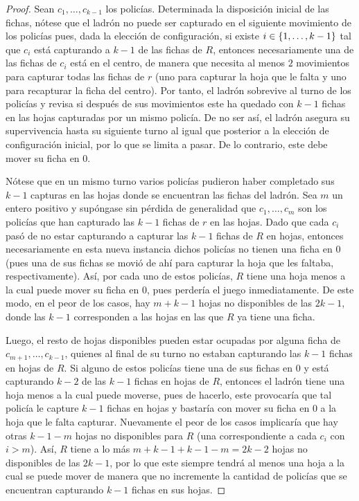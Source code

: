 \begin{proof}
    Sean $c_1,\dots, c_{k-1}$ los polic\'ias. Determinada la disposici\'on
    inicial de las fichas, n\'otese que el ladr\'on no puede ser capturado en el
    siguiente movimiento de los polic\'ias pues, dada la elecci\'on de
    configuraci\'on, si existe $i\in\{1,\dots, k-1\}$ tal que $c_i$ est\'a
    capturando a $k-1$ de las fichas de $R$, entonces necesariamente una de las
    fichas de $c_i$ est\'a en el centro, de manera que necesita al menos $2$
    movimientos para capturar todas las fichas de $r$ (uno para capturar la hoja
    que le falta y uno para recapturar la ficha del centro). Por tanto, el
    ladr\'on sobrevive al turno de los polic\'ias y revisa si despu\'es de sus
    movimientos este ha quedado con $k-1$ fichas en las hojas capturadas por un
    mismo polic\'ia. De no ser as\'i, el ladr\'on asegura su supervivencia hasta
    su siguiente turno al igual que posterior a la elecci\'on de configuraci\'on
    inicial, por lo que se limita a pasar. De lo contrario, este debe mover su
    ficha en $0$.
    
    N\'otese que en un mismo turno varios polic\'ias pudieron haber completado
    sus $k-1$ capturas en las hojas donde se encuentran las fichas del ladr\'on.
    Sea $m$ un entero positivo y sup\'ongase sin p\'erdida de generalidad que
    $c_{1},\dots, c_{m}$ son los polic\'ias que han capturado las $k-1$ fichas
    de $r$ en las hojas. Dado que cada $c_{i}$ pas\'o de no estar capturando a
    capturar las $k-1$ fichas de $R$ en hojas, entonces necesariamente en esta
    nueva instancia dichos polic\'ias no tienen una ficha en $0$ (pues una de
    sus fichas se movi\'o de ah\'i para capturar la hoja que les faltaba,
    respectivamente). As\'i, por cada uno de estos polic\'ias, $R$ tiene una
    hoja menos a la cual puede mover su ficha en $0$, pues perder\'ia el juego
    inmediatamente. De este modo, en el peor de los casos, hay $m+k-1$ hojas no
    disponibles de las $2k-1$, donde las $k-1$ corresponden a las hojas en las
    que $R$ ya tiene una ficha.

   Luego, el resto de hojas disponibles pueden estar ocupadas por alguna ficha
   de  $c_{{m+1}},\dots,c_{{k-1}}$, quienes al final de su turno no estaban
   capturando las $k-1$ fichas en hojas de $R$. Si alguno de estos polic\'ias
   tiene una de sus fichas en $0$ y est\'a capturando $k-2$ de las $k-1$ fichas
   en hojas de $R$, entonces el ladr\'on tiene una hoja menos a la cual puede
   moverse, pues de hacerlo, este provocar\'ia que tal polic\'ia le capture
   $k-1$ fichas en hojas y bastar\'ia con mover su ficha en $0$ a la hoja que le
   falta capturar. Nuevamente el peor de los casos implicar\'ia que hay otras
   $k-1-m$ hojas no disponibles para $R$ (una correspondiente a cada $c_i$ con
   $i>m$). As\'i, $R$ tiene a lo m\'as $m+k-1+k-1-m=2k-2$ hojas no disponibles
   de las $2k-1$, por lo que este siempre tendr\'a al menos una hoja a la cual
   se puede mover de manera que no incremente la cantidad de polic\'ias que se
   encuentran capturando $k-1$ fichas en sus hojas.


\end{proof}
